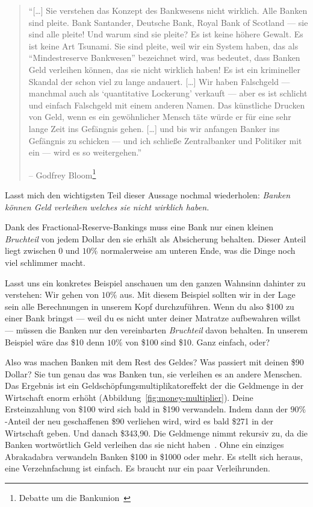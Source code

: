 \begin{quotation}\begin{samepage}
\enquote{[\ldots] Sie verstehen das Konzept des Bankwesens nicht wirklich. Alle
Banken sind pleite. Bank Santander, Deutsche Bank, Royal Bank of Scotland --- sie
sind alle pleite! Und warum sind sie pleite? Es ist keine höhere Gewalt. Es ist
keine Art Tsunami. Sie sind pleite, weil wir ein System haben, das als
“Mindestreserve Bankwesen” bezeichnet wird, was bedeutet, dass Banken Geld
verleihen können, das sie nicht wirklich haben! Es ist ein krimineller Skandal
der schon viel zu lange andauert. [\ldots]
Wir haben Falschgeld --- manchmal auch als \enquote{quantitative Lockerung}
verkauft --- aber es ist schlicht und einfach Falschgeld mit einem anderen
Namen. Das künstliche Drucken von Geld, wenn es ein gewöhnlicher Mensch täte
würde er für eine sehr lange Zeit ins Gefängnis gehen. [\ldots] und bis wir
anfangen Banker ins Gefängnis zu schicken — und ich schließe Zentralbanker und
Politiker mit ein — wird es so weitergehen.}
\begin{flushright} -- Godfrey Bloom\footnote{Debatte um die Bankunion~\cite{godfrey-bloom}}
\end{flushright}\end{samepage}\end{quotation}

Lasst mich den wichtigsten Teil dieser Aussage nochmal wiederholen:
\textit{Banken können Geld verleihen welches sie nicht wirklich haben.}

Dank des Fractional-Reserve-Bankings muss eine Bank nur einen kleinen \textit{Bruchteil}
von jedem Dollar den sie erhält als Absicherung behalten. Dieser Anteil liegt
zwischen $0$ und $10\%$ normalerweise am unteren Ende, was die Dinge noch viel
schlimmer macht.

Lasst uns ein konkretes Beispiel anschauen um den ganzen Wahnsinn dahinter zu
verstehen: Wir gehen von $10\%$ aus. Mit diesem Beispiel sollten wir in der Lage
sein alle Berechnungen in unserem Kopf durchzuführen.  Wenn du also \$100 zu
einer Bank bringst --- weil du es nicht unter deiner Matratze aufbewahren willst
--- müssen die Banken nur den vereinbarten \textit{Bruchteil} davon behalten. In
unserem Beispiel wäre das \$10 denn $10\%$ von \$100 sind \$10. Ganz einfach,
oder?

Also was machen Banken mit dem Rest des Geldes? Was passiert mit deinen \$90
Dollar? Sie tun genau das was Banken tun, sie verleihen es an andere Menschen.
Das Ergebnis ist ein Geldschöpfungsmultiplikatoreffekt der die Geldmenge in der
Wirtschaft enorm erhöht (Abbildung~\ref{fig:money-multiplier}). Deine
Ersteinzahlung von \$100 wird sich bald in \$190 verwandeln. Indem dann der
$90\%$-Anteil der neu geschaffenen \$90 verliehen wird, wird es bald \$271 in
der Wirtschaft geben. Und danach \$343,90. Die Geldmenge nimmt rekursiv zu, da
die Banken wortwörtlich Geld verleihen das sie nicht
haben~\cite{wiki:money-multiplier}. Ohne ein einziges Abrakadabra verwandeln
Banken \$100 in \$1000 oder mehr. Es stellt sich heraus, eine
Verzehnfachung ist einfach. Es braucht nur ein paar Verleihrunden.

